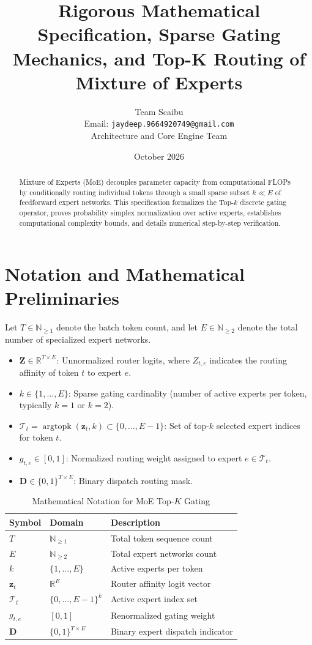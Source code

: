 \documentclass[11pt,a4paper]{article}
\title{\textbf{Rigorous Mathematical Specification, Sparse Gating Mechanics, and Top-K Routing of Mixture of Experts}}
\author{Team Scaibu \\ \small Email: \texttt{jaydeep.9664920749@gmail.com} \\ \small Architecture and Core Engine Team}
\date{October 2026}
\theoremstyle{definition}
\begin{document}
\maketitle

\begin{abstract}
Mixture of Experts (MoE) decouples parameter capacity from computational FLOPs by conditionally routing individual tokens through a small sparse subset $k \ll E$ of feedforward expert networks. This specification formalizes the Top-$k$ discrete gating operator, proves probability simplex normalization over active experts, establishes computational complexity bounds, and details numerical step-by-step verification.
\end{abstract}

\section{Notation and Mathematical Preliminaries}

Let $T \in \mathbb{N}_{\ge 1}$ denote the batch token count, and let $E \in \mathbb{N}_{\ge 2}$ denote the total number of specialized expert networks.

\begin{itemize}
    \item $\mathbf{Z} \in \mathbb{R}^{T \times E}$: Unnormalized router logits, where $Z_{t, e}$ indicates the routing affinity of token $t$ to expert $e$.
    \item $k \in \{1, \dots, E\}$: Sparse gating cardinality (number of active experts per token, typically $k=1$ or $k=2$).
    \item $\mathcal{T}_t = \operatorname{argtopk}(\mathbf{z}_t, k) \subset \{0, \dots, E-1\}$: Set of top-$k$ selected expert indices for token $t$.
    \item $g_{t, e} \in [0, 1]$: Normalized routing weight assigned to expert $e \in \mathcal{T}_t$.
    \item $\mathbf{D} \in \{0, 1\}^{T \times E}$: Binary dispatch routing mask.
\end{itemize}

\begin{table}[h]
\centering
\caption{Mathematical Notation for MoE Top-$K$ Gating}
\begin{tabular}{lll}
\toprule
\textbf{Symbol} & \textbf{Domain} & \textbf{Description} \\
\midrule
$T$ & $\mathbb{N}_{\ge 1}$ & Total token sequence count \\
$E$ & $\mathbb{N}_{\ge 2}$ & Total expert networks count \\
$k$ & $\{1, \dots, E\}$ & Active experts per token \\
$\mathbf{z}_t$ & $\mathbb{R}^E$ & Router affinity logit vector \\
$\mathcal{T}_t$ & $\{0, \dots, E-1\}^k$ & Active expert index set \\
$g_{t, e}$ & $[0, 1]$ & Renormalized gating weight \\
$\mathbf{D}$ & $\{0, 1\}^{T \times E}$ & Binary expert dispatch indicator \\
\bottomrule
\end{tabular}
\end{table}
\end{document}
